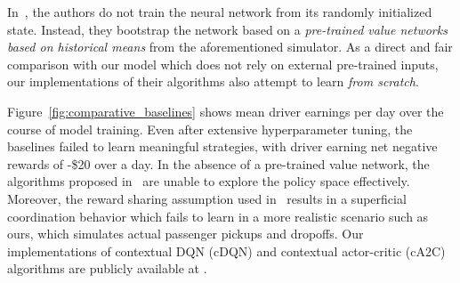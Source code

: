 In~\cite{Lin2018-vs}, the authors do not train the neural network
    from its randomly initialized state.
Instead, they bootstrap the network based on a \textit{pre-trained value networks
    based on historical means} from the aforementioned simulator.
As a direct and fair comparison with our model which does not rely on
    external pre-trained inputs, our implementations of their algorithms 
    also attempt to learn \emph{from scratch}. 

Figure~\ref{fig:comparative_baselines} shows mean driver earnings per day over
    the course of model training.
Even after extensive hyperparameter tuning, the baselines failed
    to learn meaningful strategies, with driver earning net negative rewards
    of -\$20 over a day.
In the absence of a pre-trained value network, the
    algorithms proposed in~\cite{Lin2018-vs} are unable to explore the policy space
    effectively.
Moreover, the reward sharing assumption used in~\cite{Lin2018-vs} results in a 
    superficial coordination behavior which fails to learn in a more realistic 
    scenario such as ours, which simulates actual passenger pickups and dropoffs.
Our implementations of contextual DQN (cDQN) and contextual actor-critic (cA2C)
    algorithms
    are publicly available at \cite{github-page}. 
